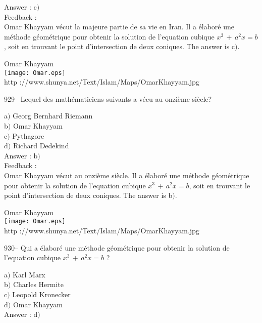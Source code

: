 \documentclass[letterpaper, 12pt]{article}
\begin{document}
Answer : c$)$\\

Feedback : \\
Omar Khayyam v\'ecut la majeure partie de sa vie en Iran. Il a
\'elabor\'e une m\'ethode g\'eom\'etrique pour obtenir la solution
de l'equation cubique $x^3\,+\,a^2x=b$,
soit en trouvant le point d'intersection de deux coniques. The answer is
c$)$.\\

        \begin{center}
        Omar Khayyam\\
    \texttt{[image: Omar.eps]}\\
        {\footnotesize http
://www.shunya.net/Text/Islam/Maps/OmarKhayyam.jpg}
    \end{center}

929-- Lequel des math\'ematiciens suivants a v\'ecu au onzi\`eme
si\`ecle?

a$)$ Georg Bernhard Riemann \\
b$)$ Omar Khayyam \\
c$)$ Pythagore \\
d$)$ Richard Dedekind\\

Answer : b$)$\\

Feedback :\\
Omar Khayyam v\'ecut au onzi\`eme si\`ecle. Il a \'elabor\'e une
m\'ethode g\'eom\'etrique pour obtenir
la solution de l'equation cubique $x^3\,+\,a^2x=b$, soit en trouvant le
point d'intersection de deux coniques. The answer is b$)$.\\

        \begin{center}
        Omar Khayyam\\
    \texttt{[image: Omar.eps]}\\
        {\footnotesize http
://www.shunya.net/Text/Islam/Maps/OmarKhayyam.jpg}
    \end{center}

930-- Qui a \'elabor\'e une m\'ethode g\'eom\'etrique pour obtenir
la solution de l'equation cubique $x^3\,+\,a^2x=b$ ?

a$)$ Karl Marx \\
b$)$ Charles Hermite \\
c$)$ Leopold Kronecker \\
d$)$ Omar Khayyam \\

Answer : d$)$\\
\end{document}
